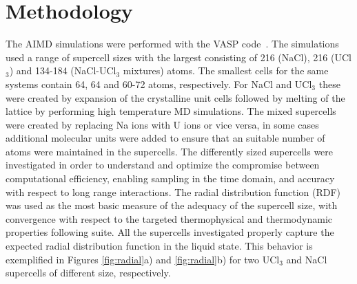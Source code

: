 \documentclass[titlepage=firstiscover,11pt,fleqn,headheight=14pt,footheight=40.8pt]{scrreprt}
\begin{document}
\section{Methodology}
\label{sec:method}
The AIMD simulations were performed with the VASP code~\cite{Kresse1996}. The simulations used a range of supercell sizes with the largest consisting of 216 (NaCl), 216 (UCl$_3$) and 134-184 (NaCl-UCl$_3$ mixtures) atoms. The smallest cells for the same systems contain 64, 64 and 60-72 atoms, respectively. %
For NaCl and UCl$_3$ these were created by expansion of the crystalline unit cells followed by melting of the lattice by performing high temperature MD simulations. %
The mixed supercells were created by replacing Na ions with U ions or vice versa, in some cases additional molecular units were added to ensure that an suitable number of atoms were maintained in the supercells. %
The differently sized supercells were investigated in order to understand and optimize the compromise between computational efficiency, enabling sampling in the time domain, and accuracy with respect to long range interactions. The radial distribution function (RDF) was used as the most basic measure of the adequacy of the supercell size, with convergence with respect to the targeted thermophysical and thermodynamic properties following suite. 
All the supercells investigated properly capture the expected radial distribution function in the liquid state. %
This behavior is exemplified in Figures \ref{fig:radial}a) and \ref{fig:radial}b) for two UCl$_3$ and NaCl supercells of different size, respectively. %
\end{document}
